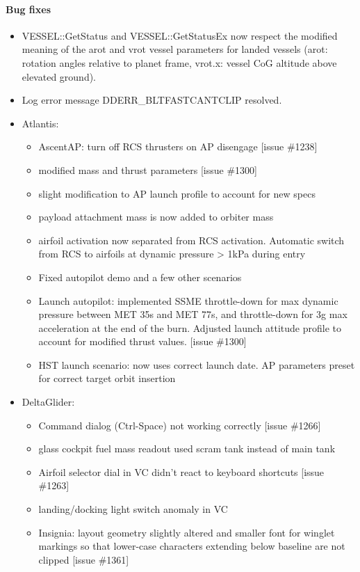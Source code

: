\documentclass[Orbiter User Manual.tex]{subfiles}
\begin{document}
\paragraph{Bug fixes}

\begin{itemize}
	\item VESSEL::GetStatus and VESSEL::GetStatusEx now respect the modified meaning of the arot and vrot vessel parameters for landed vessels (arot: rotation angles relative to planet frame, vrot.x: vessel CoG altitude above elevated ground).
	\item Log error message DDERR\_BLTFASTCANTCLIP resolved.
	\item Atlantis:
	\begin{itemize}
		\item AscentAP: turn off RCS thrusters on AP disengage [issue \#1238]
		\item modified mass and thrust parameters [issue \#1300]
		\item slight modification to AP launch profile to account for new specs
		\item payload attachment mass is now added to orbiter mass
		\item airfoil activation now separated from RCS activation. Automatic switch from RCS to airfoils at dynamic pressure > 1kPa during entry
		\item Fixed autopilot demo and a few other scenarios
		\item Launch autopilot: implemented SSME throttle-down for max dynamic pressure between MET 35s and MET 77s, and throttle-down for 3g max acceleration at the end of the burn. Adjusted launch attitude profile to account for modified thrust values. [issue \#1300]
		\item HST launch scenario: now uses correct launch date. AP parameters preset for correct target orbit insertion
	\end{itemize}
	\item DeltaGlider:
	\begin{itemize}
		\item Command dialog (Ctrl-Space) not working correctly [issue \#1266]
		\item glass cockpit fuel mass readout used scram tank instead of main tank
		\item Airfoil selector dial in VC didn't react to keyboard shortcuts [issue \#1263]
		\item landing/docking light switch anomaly in VC
		\item Insignia: layout geometry slightly altered and smaller font for winglet markings so that lower-case characters extending below baseline are not clipped [issue \#1361]

\end{itemize}
\end{itemize}
\end{document}
